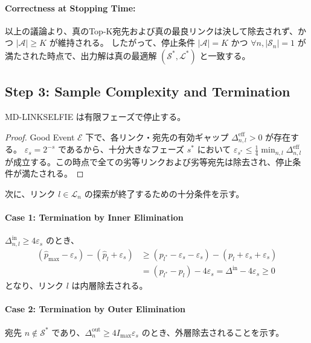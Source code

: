 \documentclass[conference]{IEEEtran}
\begin{document}
\paragraph{Correctness at Stopping Time:}
以上の議論より、真のTop-K宛先および真の最良リンクは決して除去されず、かつ $|\mathcal{A}| \ge K$ が維持される。
したがって、停止条件 $|\mathcal{A}| = K$ かつ $\forall n, |\mathcal{S}_n|=1$ が満たされた時点で、出力解は真の最適解 $(\mathcal{S}^*, \mathcal{L}^*)$ と一致する。

\subsection{Step 3: Sample Complexity and Termination}

\begin{lemma}[Termination]
MD-LINKSELFIE は有限フェーズで停止する。
\end{lemma}
\begin{proof}
Good Event $\mathcal{E}$ 下で、各リンク・宛先の有効ギャップ $\Delta_{n,l}^{\mathrm{eff}} > 0$ が存在する。
$\varepsilon_s = 2^{-s}$ であるから、十分大きなフェーズ $s^*$ において $\varepsilon_{s^*} \le \frac{1}{4} \min_{n,l} \Delta_{n,l}^{\mathrm{eff}}$ が成立する。この時点で全ての劣等リンクおよび劣等宛先は除去され、停止条件が満たされる。
\end{proof}

次に、リンク $l \in \mathcal{L}_n$ の探索が終了するための十分条件を示す。

\paragraph{Case 1: Termination by Inner Elimination}
$\Delta_{n,l}^{\mathrm{in}} \ge 4\varepsilon_s$ のとき、
\begin{align}
    (\hat{p}_{\max} - \varepsilon_s) - (\hat{p}_l + \varepsilon_s) &\ge (p_{l^*} - \varepsilon_s - \varepsilon_s) - (p_l + \varepsilon_s + \varepsilon_s) \\
    &= (p_{l^*} - p_l) - 4\varepsilon_s = \Delta^{\mathrm{in}} - 4\varepsilon_s \ge 0
\end{align}
となり、リンク $l$ は内層除去される。

\paragraph{Case 2: Termination by Outer Elimination}
宛先 $n \notin \mathcal{S}^*$ であり、$\Delta_n^{\mathrm{out}} \ge 4 I_{\max} \varepsilon_s$ のとき、外層除去されることを示す。
\end{document}
